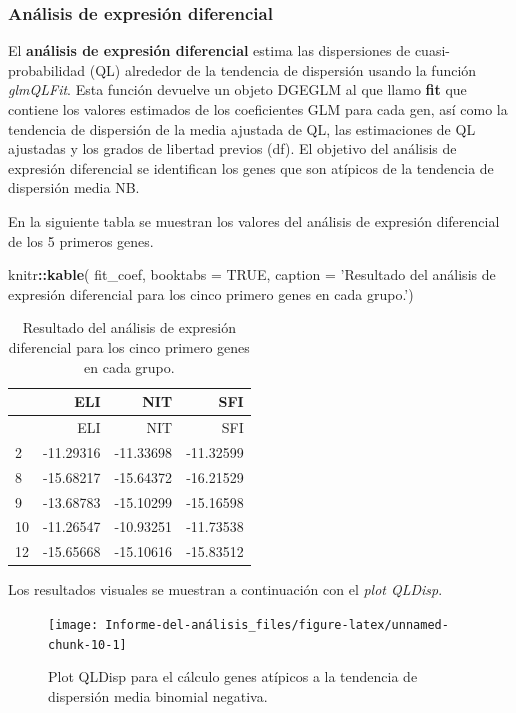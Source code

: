 \documentclass[]{article}
\newenvironment{Shaded}{\begin{snugshade}}{\end{snugshade}}
\newcommand{\DataTypeTok}[1]{\textcolor[rgb]{0.13,0.29,0.53}{#1}}
\newcommand{\KeywordTok}[1]{\textcolor[rgb]{0.13,0.29,0.53}{\textbf{#1}}}
\newcommand{\NormalTok}[1]{#1}
\newcommand{\OperatorTok}[1]{\textcolor[rgb]{0.81,0.36,0.00}{\textbf{#1}}}
\newcommand{\OtherTok}[1]{\textcolor[rgb]{0.56,0.35,0.01}{#1}}
\newcommand{\StringTok}[1]{\textcolor[rgb]{0.31,0.60,0.02}{#1}}
\begin{document}
\hypertarget{anuxe1lisis-de-expresiuxf3n-diferencial}{%
\subsubsection{Análisis de expresión
diferencial}\label{anuxe1lisis-de-expresiuxf3n-diferencial}}

El \textbf{análisis de expresión diferencial} estima las dispersiones de
cuasi-probabilidad (QL) alrededor de la tendencia de dispersión usando
la función \emph{glmQLFit}. Esta función devuelve un objeto DGEGLM al
que llamo \textbf{fit} que contiene los valores estimados de los
coeficientes GLM para cada gen, así como la tendencia de dispersión de
la media ajustada de QL, las estimaciones de QL ajustadas y los grados
de libertad previos (df). El objetivo del análisis de expresión
diferencial se identifican los genes que son atípicos de la tendencia de
dispersión media NB.

En la siguiente tabla se muestran los valores del análisis de expresión
diferencial de los 5 primeros genes.

\begin{Shaded}
\begin{Highlighting}[]
\NormalTok{knitr}\OperatorTok{::}\KeywordTok{kable}\NormalTok{(}
\NormalTok{  fit_coef, }\DataTypeTok{booktabs =} \OtherTok{TRUE}\NormalTok{,}
  \DataTypeTok{caption =} \StringTok{'Resultado del análisis de expresión diferencial para los cinco primero genes en cada grupo.'}\NormalTok{)}
\end{Highlighting}
\end{Shaded}

\begin{longtable}[]{@{}lrrr@{}}
\caption{Resultado del análisis de expresión diferencial para los cinco
primero genes en cada grupo.}\tabularnewline
\toprule
& ELI & NIT & SFI\tabularnewline
\midrule
\endfirsthead
\toprule
& ELI & NIT & SFI\tabularnewline
\midrule
\endhead
2 & -11.29316 & -11.33698 & -11.32599\tabularnewline
8 & -15.68217 & -15.64372 & -16.21529\tabularnewline
9 & -13.68783 & -15.10299 & -15.16598\tabularnewline
10 & -11.26547 & -10.93251 & -11.73538\tabularnewline
12 & -15.65668 & -15.10616 & -15.83512\tabularnewline
\bottomrule
\end{longtable}

Los resultados visuales se muestran a continuación con el \emph{plot
QLDisp}.

\begin{figure}[H]

{\centering \texttt{[image: Informe-del-análisis\_files/figure-latex/unnamed-chunk-10-1]} 

}

\caption{Plot QLDisp para el cálculo genes atípicos a la tendencia de dispersión media binomial negativa.}\label{fig:unnamed-chunk-10}
\end{figure}
\end{document}
